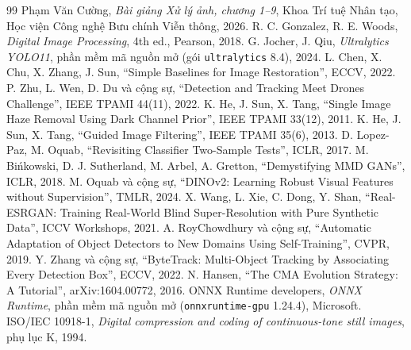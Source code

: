 \renewcommand{\refname}{Tài liệu tham khảo}
\begin{thebibliography}{99}
\setlength{\itemsep}{1pt}
\small
{} Phạm Văn Cường, \emph{Bài giảng Xử lý ảnh, chương 1–9}, Khoa Trí tuệ Nhân tạo, Học viện Công nghệ Bưu chính Viễn thông, 2026.
 R. C. Gonzalez, R. E. Woods, \emph{Digital Image Processing}, 4th ed., Pearson, 2018.
 G. Jocher, J. Qiu, \emph{Ultralytics YOLO11}, phần mềm mã nguồn mở (gói \texttt{ultralytics} 8.4), 2024.
 L. Chen, X. Chu, X. Zhang, J. Sun, ``Simple Baselines for Image Restoration'', ECCV, 2022.
 P. Zhu, L. Wen, D. Du và cộng sự, ``Detection and Tracking Meet Drones Challenge'', IEEE TPAMI 44(11), 2022.
 K. He, J. Sun, X. Tang, ``Single Image Haze Removal Using Dark Channel Prior'', IEEE TPAMI 33(12), 2011.
 K. He, J. Sun, X. Tang, ``Guided Image Filtering'', IEEE TPAMI 35(6), 2013.
 D. Lopez-Paz, M. Oquab, ``Revisiting Classifier Two-Sample Tests'', ICLR, 2017.
 M. Bińkowski, D. J. Sutherland, M. Arbel, A. Gretton, ``Demystifying MMD GANs'', ICLR, 2018.
 M. Oquab và cộng sự, ``DINOv2: Learning Robust Visual Features without Supervision'', TMLR, 2024.
 X. Wang, L. Xie, C. Dong, Y. Shan, ``Real-ESRGAN: Training Real-World Blind Super-Resolution with Pure Synthetic Data'', ICCV Workshops, 2021.
 A. RoyChowdhury và cộng sự, ``Automatic Adaptation of Object Detectors to New Domains Using Self-Training'', CVPR, 2019.
 Y. Zhang và cộng sự, ``ByteTrack: Multi-Object Tracking by Associating Every Detection Box'', ECCV, 2022.
 N. Hansen, ``The CMA Evolution Strategy: A Tutorial'', arXiv:1604.00772, 2016.
 ONNX Runtime developers, \emph{ONNX Runtime}, phần mềm mã nguồn mở (\texttt{onnxruntime-gpu} 1.24.4), Microsoft.
 ISO/IEC 10918-1, \emph{Digital compression and coding of continuous-tone still images}, phụ lục K, 1994.
\end{thebibliography}
